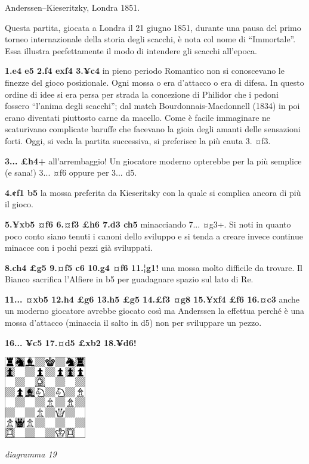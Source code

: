 \documentclass[
]{article}
\begin{document}
Anderssen--Kieseritzky, Londra 1851.

Questa partita, giocata a Londra il 21 giugno 1851, durante una pausa
del primo torneo internazionale della storia degli scacchi, è nota col
nome di ``Immortale''. Essa illustra pe¢fettamente il modo di intendere
gli scacchi all'epoca.

\textbf{1.e4 e5 2.f4 exf4 3.¥c4} in pieno periodo Romantico non si
conoscevano le finezze del gioco posizionale. Ogni mossa o era d'attacco
o era di difesa. In questo ordine di idee si era persa per strada la
concezione di Philidor che i pedoni fossero ``l'anima degli scacchi'';
dal match Bourdonnais-Macdonnell (1834) in poi erano diventati piuttosto
carne da macello. Come è facile immaginare ne scaturivano complicate
baruffe che facevano la gioia degli amanti delle sensazioni forti. Oggi,
si veda la partita successiva, si preferisce la più cauta 3. ¤f3.

\textbf{3... £h4+} all'arrembaggio! Un giocatore moderno opterebbe per
la più semplice (e sana!) 3... ¤f6 oppure per 3... d5.

\textbf{4.¢f1 b5} la mossa preferita da Kieseritsky con la quale si
complica ancora di più il gioco.

\textbf{5.¥xb5 ¤f6 6.¤f3 £h6 7.d3 ch5} minacciando 7... ¤g3+. Si noti in
quanto poco conto siano tenuti i canoni dello sviluppo e si tenda a
creare invece continue minacce con i pochi pezzi già sviluppati.

\textbf{8.ch4 £g5 9.¤f5 c6 10.g4 ¤f6 11.¦g1!} una mossa molto difficile
da trovare. Il Bianco sacrifica l'Alfiere in b5 per guadagnare spazio
sul lato di Re.

\textbf{11... ¤xb5 12.h4 £g6 13.h5 £g5 14.£f3 ¤g8 15.¥xf4 £f6 16.¤c3}
anche un moderno giocatore avrebbe giocato così ma Anderssen la effettua
perché è una mossa d'attacco (minaccia il salto in d5) non per
sviluppare un pezzo.

\textbf{16... ¥c5 17.¤d5 £xb2 18.¥d6!}

\includegraphics[width=1.40972in,height=1.40972in]{vertopal_109f12be458a423d8f3cc838880eaea2/media/image19.png}

\emph{diagramma 19}
\end{document}
